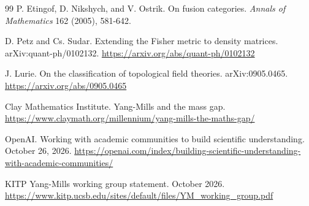 \documentclass[11pt,letterpaper]{article}
\theoremstyle{definition}
\theoremstyle{remark}
\begin{document}
\begin{thebibliography}{99}
P. Etingof, D. Nikshych, and V. Ostrik. On fusion categories. \emph{Annals of Mathematics} 162 (2005), 581-642.

D. Petz and Cs. Sudar. Extending the Fisher metric to density matrices. arXiv:quant-ph/0102132. \url{https://arxiv.org/abs/quant-ph/0102132}

J. Lurie. On the classification of topological field theories. arXiv:0905.0465. \url{https://arxiv.org/abs/0905.0465}

Clay Mathematics Institute. Yang-Mills and the mass gap. \url{https://www.claymath.org/millennium/yang-mills-the-maths-gap/}

OpenAI. Working with academic communities to build scientific understanding. October 26, 2026. \url{https://openai.com/index/building-scientific-understanding-with-academic-communities/}

KITP Yang-Mills working group statement. October 2026. \url{https://www.kitp.ucsb.edu/sites/default/files/YM_working_group.pdf}

\end{thebibliography}
\end{document}
